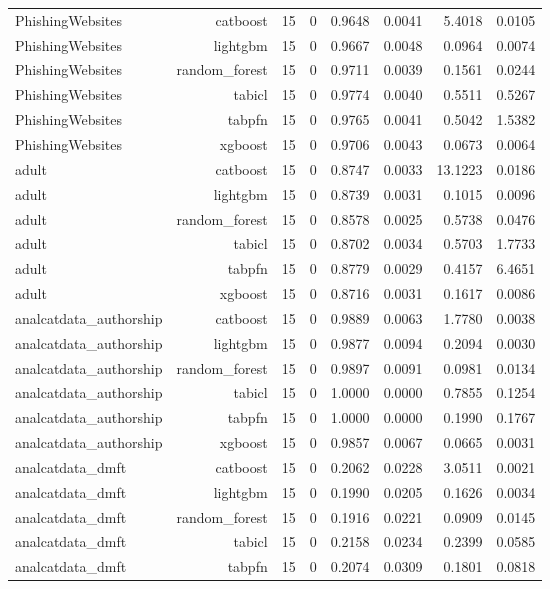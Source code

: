 \begin{table}[htbp]
\begin{tabular}{lrrrrrrr}
PhishingWebsites & catboost & 15 & 0 & 0.9648 & 0.0041 & 5.4018 & 0.0105 \\
PhishingWebsites & lightgbm & 15 & 0 & 0.9667 & 0.0048 & 0.0964 & 0.0074 \\
PhishingWebsites & random\_forest & 15 & 0 & 0.9711 & 0.0039 & 0.1561 & 0.0244 \\
PhishingWebsites & tabicl & 15 & 0 & 0.9774 & 0.0040 & 0.5511 & 0.5267 \\
PhishingWebsites & tabpfn & 15 & 0 & 0.9765 & 0.0041 & 0.5042 & 1.5382 \\
PhishingWebsites & xgboost & 15 & 0 & 0.9706 & 0.0043 & 0.0673 & 0.0064 \\
adult & catboost & 15 & 0 & 0.8747 & 0.0033 & 13.1223 & 0.0186 \\
adult & lightgbm & 15 & 0 & 0.8739 & 0.0031 & 0.1015 & 0.0096 \\
adult & random\_forest & 15 & 0 & 0.8578 & 0.0025 & 0.5738 & 0.0476 \\
adult & tabicl & 15 & 0 & 0.8702 & 0.0034 & 0.5703 & 1.7733 \\
adult & tabpfn & 15 & 0 & 0.8779 & 0.0029 & 0.4157 & 6.4651 \\
adult & xgboost & 15 & 0 & 0.8716 & 0.0031 & 0.1617 & 0.0086 \\
analcatdata\_authorship & catboost & 15 & 0 & 0.9889 & 0.0063 & 1.7780 & 0.0038 \\
analcatdata\_authorship & lightgbm & 15 & 0 & 0.9877 & 0.0094 & 0.2094 & 0.0030 \\
analcatdata\_authorship & random\_forest & 15 & 0 & 0.9897 & 0.0091 & 0.0981 & 0.0134 \\
analcatdata\_authorship & tabicl & 15 & 0 & 1.0000 & 0.0000 & 0.7855 & 0.1254 \\
analcatdata\_authorship & tabpfn & 15 & 0 & 1.0000 & 0.0000 & 0.1990 & 0.1767 \\
analcatdata\_authorship & xgboost & 15 & 0 & 0.9857 & 0.0067 & 0.0665 & 0.0031 \\
analcatdata\_dmft & catboost & 15 & 0 & 0.2062 & 0.0228 & 3.0511 & 0.0021 \\
analcatdata\_dmft & lightgbm & 15 & 0 & 0.1990 & 0.0205 & 0.1626 & 0.0034 \\
analcatdata\_dmft & random\_forest & 15 & 0 & 0.1916 & 0.0221 & 0.0909 & 0.0145 \\
analcatdata\_dmft & tabicl & 15 & 0 & 0.2158 & 0.0234 & 0.2399 & 0.0585 \\
analcatdata\_dmft & tabpfn & 15 & 0 & 0.2074 & 0.0309 & 0.1801 & 0.0818 \\

\end{tabular}
\end{table}
